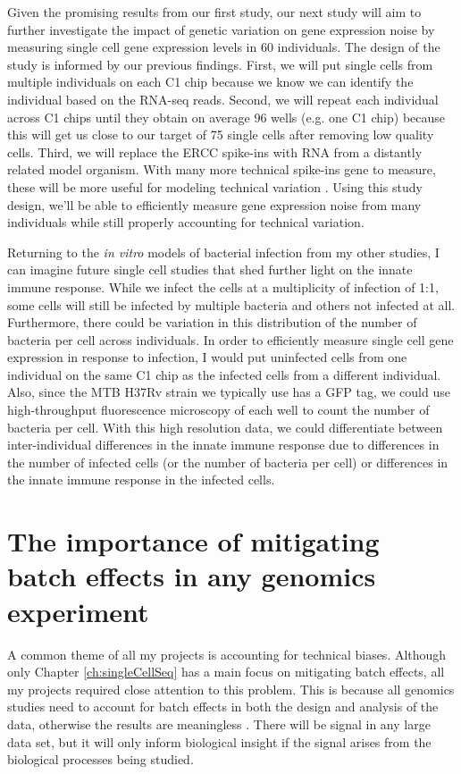 Given the promising results from our first study, our next study will
aim to further investigate the impact of genetic variation on gene
expression noise by measuring single cell gene expression levels in 60
individuals. The design of the study is informed by our previous
findings. First, we will put single cells from multiple individuals on
each C1 chip because we know we can identify the individual based on
the RNA-seq reads. Second, we will repeat each individual across C1
chips until they obtain on average 96 wells (e.g. one C1 chip) because
this will get us close to our target of 75 single cells after removing
low quality cells. Third, we will replace the ERCC spike-ins with RNA
from a distantly related model organism. With many more technical
spike-ins gene to measure, these will be more useful for modeling
technical variation \citep{Risso2014}. Using this study design, we'll
be able to efficiently measure gene expression noise from many
individuals while still properly accounting for technical variation.

Returning to the \emph{in vitro} models of bacterial infection from my
other studies, I can imagine future single cell studies that shed
further light on the innate immune response. While we infect the cells
at a multiplicity of infection of 1:1, some cells will still be
infected by multiple bacteria and others not infected at
all. Furthermore, there could be variation in this distribution of the
number of bacteria per cell across individuals. In order to
efficiently measure single cell gene expression in response to
infection, I would put uninfected cells from one individual on the
same C1 chip as the infected cells from a different individual. Also,
since the MTB H37Rv strain we typically use has a GFP tag, we could
use high-throughput fluorescence microscopy of each well to count the
number of bacteria per cell. With this high resolution data, we could
differentiate between inter-individual differences in the innate
immune response due to differences in the number of infected cells (or
the number of bacteria per cell) or differences in the innate immune
response in the infected cells.

\section{The importance of mitigating batch effects in any genomics experiment}

A common theme of all my projects is accounting for technical
biases. Although only Chapter \ref{ch:singleCellSeq} has a main focus
on mitigating batch effects, all my projects required close attention
to this problem. This is because all genomics studies need to account
for batch effects in both the design and analysis of the data,
otherwise the results are meaningless \citep{Auer2010, Leek2010, Gilad2015}. There will be signal in any large
data set, but it will only inform biological insight if the signal
arises from the biological processes being studied.

